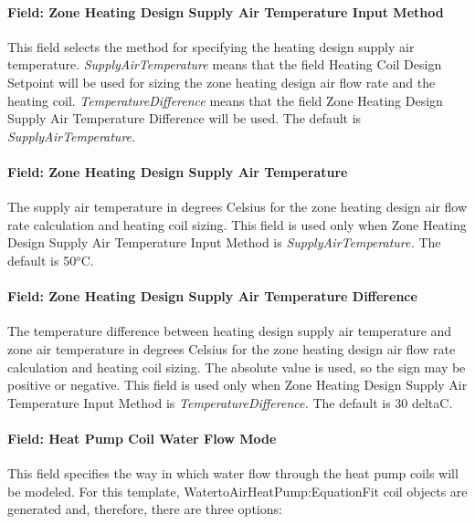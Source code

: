 \paragraph{Field: Zone Heating Design Supply Air Temperature Input Method}\label{field-zone-heating-design-supply-air-temperature-input-method-3}

This field selects the method for specifying the heating design supply air temperature. \emph{SupplyAirTemperature} means that the field Heating Coil Design Setpoint will be used for sizing the zone heating design air flow rate and the heating coil. \emph{TemperatureDifference} means that the field Zone Heating Design Supply Air Temperature Difference will be used. The default is \emph{SupplyAirTemperature.}

\paragraph{Field: Zone Heating Design Supply Air Temperature}\label{field-zone-heating-design-supply-air-temperature-2}

The supply air temperature in degrees Celsius for the zone heating design air flow rate calculation and heating coil sizing. This field is used only when Zone Heating Design Supply Air Temperature Input Method is \emph{SupplyAirTemperature.} The default is 50\(^{o}\)C.

\paragraph{Field: Zone Heating Design Supply Air Temperature Difference}\label{field-zone-heating-design-supply-air-temperature-difference-3}

The temperature difference between heating design supply air temperature and zone air temperature in degrees Celsius for the zone heating design air flow rate calculation and heating coil sizing. The absolute value is used, so the sign may be positive or negative. This field is used only when Zone Heating Design Supply Air Temperature Input Method is \emph{TemperatureDifference.} The default is 30 deltaC.

\paragraph{Field: Heat Pump Coil Water Flow Mode}\label{field-heat-pump-coil-water-flow-mode}

This field specifies the way in which water flow through the heat pump coils will be modeled. For this template, WatertoAirHeatPump:EquationFit coil objects are generated and, therefore, there are three options:

